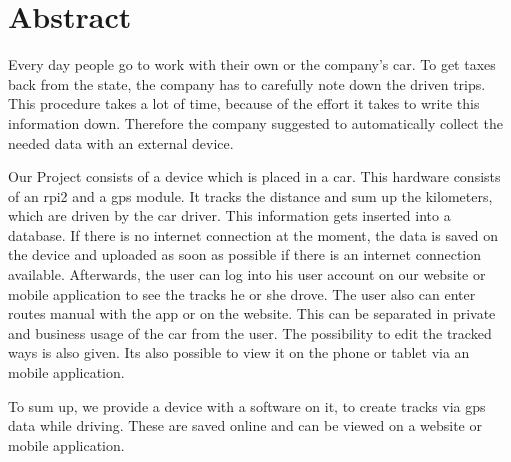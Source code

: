 \chapter*{Abstract}
Every day people go to work with their own or the company's car. To get taxes back from the state, the company has to carefully note down the driven trips. This procedure takes a lot of time,  because of the effort it takes to write this information down. Therefore the company suggested to automatically collect the needed data with an external device.

Our Project consists of a device which is placed in a car. This hardware consists of an \gls{rpi2} and a \gls{gps} module. It tracks the distance and sum up the kilometers, which are driven by the car driver. This information gets inserted into a database. If there is no internet connection at the moment, the data is saved on the device and uploaded as soon as possible if there is an internet connection available. Afterwards, the user can log into his user account on our website or mobile application to see the tracks he or she drove. The user also can enter routes manual with the app or on the website. This can be separated in private and business usage of the car from the user. The possibility to edit the tracked ways is also given. Its also possible to view it on the phone or tablet via an mobile application.

To sum up, we provide a device with a software on it, to create tracks via \gls{gps} data while driving. These are saved online and can be viewed on a website or mobile application.
\clearpageauthor
